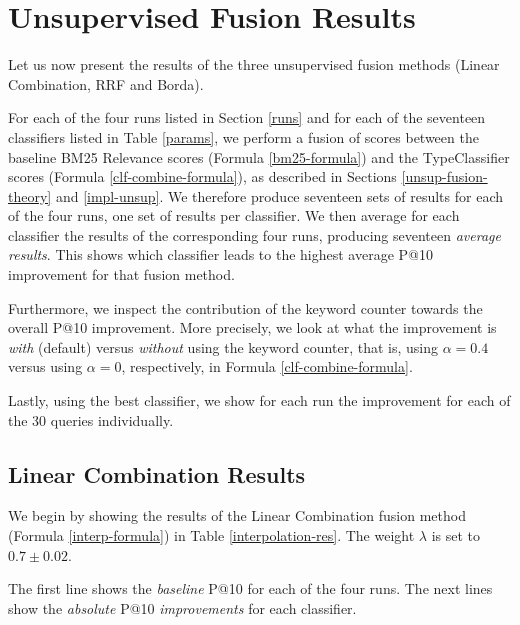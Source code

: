 \section{Unsupervised Fusion Results}
Let us now present the results of the three unsupervised fusion methods (Linear Combination, RRF and Borda).

For each of the four runs listed in Section \ref{runs} and for each of the seventeen classifiers listed in Table \ref{params},
we perform a fusion of scores
between the baseline BM25 \textsf{Relevance} scores (Formula \ref{bm25-formula})
and the \textsf{TypeClassifier} scores (Formula \ref{clf-combine-formula}), as described in Sections \ref{unsup-fusion-theory}
and \ref{impl-unsup}.
We therefore produce seventeen sets of results for each of the four runs,
one set of results per classifier.
We then average for each classifier the results of the corresponding four runs, producing seventeen \emph{average results}.
This shows which classifier leads to the highest average P@10 improvement for that fusion method.

Furthermore, we inspect the contribution of the keyword counter towards the overall P@10 improvement. More precisely,
we look at what the improvement is \emph{with} (default) versus \emph{without} using the keyword counter, that is, using $\alpha=0.4$
versus using $\alpha=0$, respectively, in Formula \ref{clf-combine-formula}.

Lastly, using the best classifier, we show for each run the improvement for each of the 30 queries individually.

\subsection{Linear Combination Results}
We begin by showing the results of the Linear Combination fusion method (Formula \ref{interp-formula}) in Table \ref{interpolation-res}.
The weight $\lambda$ is set to $0.7\pm 0.02$.

The first line shows the \emph{baseline} P@10 for each of the four runs.
The next lines show the \emph{absolute} P@10 \emph{improvements} for each classifier.

